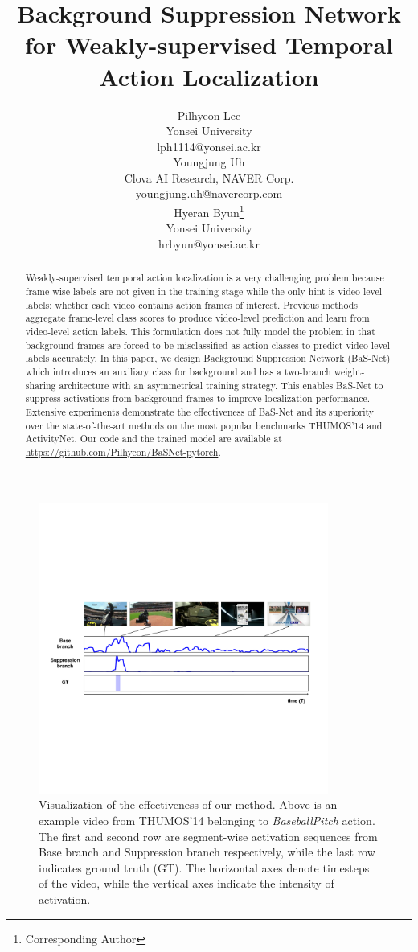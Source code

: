 \documentclass[letterpaper]{article} %
\title{Background Suppression Network \\for Weakly-supervised Temporal Action Localization}
\author{%
  Pilhyeon Lee\\
  Yonsei University\\
  lph1114@yonsei.ac.kr \\
  \And
  Youngjung Uh \\
  Clova AI Research, NAVER Corp. \\
  youngjung.uh@navercorp.com \\
  \And
  Hyeran Byun\thanks{Corresponding Author} \\
  Yonsei University\\
  hrbyun@yonsei.ac.kr \\
}
\begin{document}
\maketitle

\begin{abstract}
Weakly-supervised temporal action localization is a very challenging problem because frame-wise labels are not given in the training stage while the only hint is video-level labels: whether each video contains action frames of interest.
Previous methods aggregate frame-level class scores to produce video-level prediction and learn from video-level action labels. This formulation does not fully model the problem in that background frames are forced to be misclassified as action classes to predict video-level labels accurately.
In this paper, we design Background Suppression Network (BaS-Net) which introduces an auxiliary class for background and has a two-branch weight-sharing architecture with an asymmetrical training strategy. This enables BaS-Net to suppress activations from background frames to improve localization performance.
Extensive experiments demonstrate the effectiveness of BaS-Net and its superiority over the state-of-the-art methods on the most popular benchmarks  THUMOS'14 and ActivityNet. Our code and the trained model are available at \href{https://github.com/Pilhyeon/BaSNet-pytorch}{https://github.com/Pilhyeon/BaSNet-pytorch}.
\end{abstract}

\begin{figure}[t]
  \centering
  \includegraphics[width=0.85\textwidth]{figure_1.pdf}
  \caption{
  Visualization of the effectiveness of our method.
  Above is an example video from THUMOS'14 belonging to \textit{BaseballPitch} action. The first and second row are segment-wise activation sequences from Base branch and Suppression branch respectively, while the last row indicates ground truth (GT). 
  The horizontal axes denote timesteps of the video, while the vertical axes indicate the intensity of activation.
  }
  \label{fig:intro_figure}
\end{figure}
\end{document}
